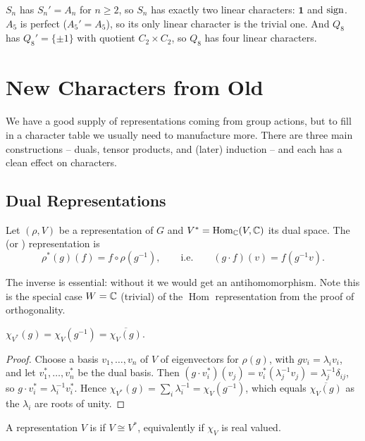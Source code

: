 \documentclass[a4paper]{scrartcl}
\newcommand{\Hom}{\operatorname{Hom}}
\begin{document}
\begin{example}
	$S_n$ has $S_n' = A_n$ for $n\geq 2$, so $S_n$ has exactly two linear characters: $\mathbf 1$ and $\operatorname{sign}$. $A_5$ is perfect ($A_5' = A_5$), so its only linear character is the trivial one. And $Q_8$ has $Q_8' = \{\pm 1\}$ with quotient $C_2\times C_2$, so $Q_8$ has four linear characters.
\end{example}

\section{New Characters from Old}

We have a good supply of representations coming from group actions, but to fill in a character table we usually need to manufacture more. There are three main constructions -- duals, tensor products, and (later) induction -- and each has a clean effect on characters.

\subsection{Dual Representations}

\begin{definition}
	Let $(\rho, V)$ be a representation of $G$ and $V^* = \Hom_\C(V,\C)$ its dual space. The  (or ) representation is
	$$\rho^*(g)(f) = f\circ\rho(g^{-1}), \qquad \text{i.e.} \qquad (g\cdot f)(v) = f(g^{-1}v).$$
\end{definition}

The inverse is essential: without it we would get an antihomomorphism. Note this is the special case $W = \mathbb{C}$ (trivial) of the $\Hom$ representation from the proof of orthogonality.

\begin{proposition}
	$\chi_{V^*}(g) = \chi_V(g^{-1}) = \overline{\chi_V(g)}$.
\end{proposition}
\begin{proof}
	Choose a basis $v_1,\dots,v_n$ of $V$ of eigenvectors for $\rho(g)$, with $gv_i = \lambda_i v_i$, and let $v_1^*,\dots,v_n^*$ be the dual basis. Then $(g\cdot v_i^*)(v_j) = v_i^*(\lambda_j^{-1}v_j) = \lambda_j^{-1}\delta_{ij}$, so $g\cdot v_i^* = \lambda_i^{-1}v_i^*$. Hence $\chi_{V^*}(g) = \sum_i\lambda_i^{-1} = \chi_V(g^{-1})$, which equals $\overline{\chi_V(g)}$ as the $\lambda_i$ are roots of unity.
\end{proof}

\begin{definition}
	A representation $V$ is  if $V \cong V^*$, equivalently if $\chi_V$ is real valued.
\end{definition}
\end{document}
